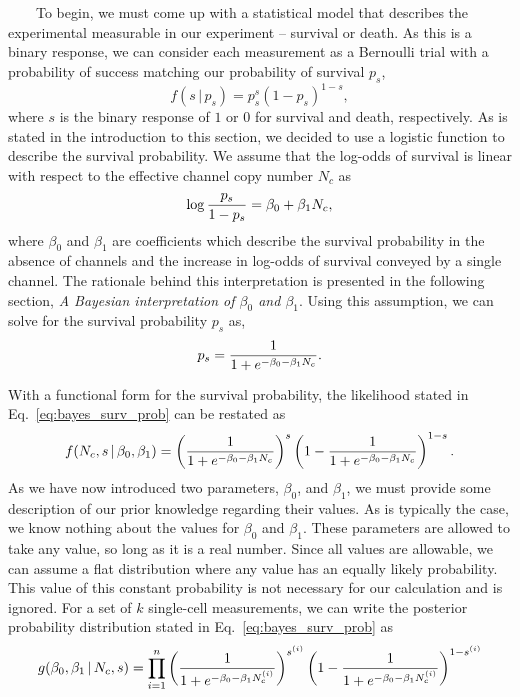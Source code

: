 ~~~~To
begin,
we
must
come
up
with a
statistical
model
that
describes
the
experimental
measurable
in our
experiment
--
survival
or
death.
As
this
is a
binary
response,
we can
consider
each
measurement
as a
Bernoulli
trial
with a
probability
of
success
matching
our
probability
of
survival
\(p_s\),
\begin{equation}
f(s\, \vert\, p_s) = p_s^s(1 - p_s)^{1-s},
\label{eq:bernoulli}\end{equation}
where
\(s\)
is the
binary
response
of
\(1\)
or
\(0\)
for
survival
and
death,
respectively.
As is
stated
in the
introduction
to
this
section,
we
decided
to use
a
logistic
function
to
describe
the
survival
probability.
We
assume
that
the
log-odds
of
survival
is
linear
with
respect
to the
effective
channel
copy
number
\(N_c\)
as
\begin{equation}
\log{p_s \over 1 - p_s} = \beta_0 + \beta_1 N_c,
\label{eq:logit}\end{equation}
where
\(\beta_0\)
and
\(\beta_1\)
are
coefficients
which
describe
the
survival
probability
in the
absence
of
channels
and
the
increase
in
log-odds
of
survival
conveyed
by a
single
channel.
The
rationale
behind
this
interpretation
is
presented
in the
following
section,
\emph{A
Bayesian
interpretation
of
\(\beta_0\)
and
\(\beta_1\)}.
Using
this
assumption,
we can
solve
for
the
survival
probability
\(p_s\)
as,
\begin{equation}
p_s = {1 \over 1 + e^{-\beta_0 -\beta_1 N_c}}.
\label{eq:logistic_prob}\end{equation}

With a
functional
form
for
the
survival
probability,
the
likelihood
stated
in
Eq.~\ref{eq:bayes_surv_prob}
can be
restated
as
\begin{equation}
f(N_c, s\,\vert\,\beta_0,\beta_1) = \left({1 \over 1 + e^{-\beta_0 - \beta_1 N_c}}\right)^s\left(1 - {1 \over 1 + e^{-\beta_0 - \beta_1 N_c}}\right)^{1 - s}.
\label{eq:bernoulli_likelihood}\end{equation}
As we
have
now
introduced
two
parameters,
\(\beta_0\),
and
\(\beta_1\),
we
must
provide
some
description
of our
prior
knowledge
regarding
their
values.
As is
typically
the
case,
we
know
nothing
about
the
values
for
\(\beta_0\)
and
\(\beta_1\).
These
parameters
are
allowed
to
take
any
value,
so
long
as it
is a
real
number.
Since
all
values
are
allowable,
we can
assume
a flat
distribution
where
any
value
has an
equally
likely
probability.
This
value
of
this
constant
probability
is not
necessary
for
our
calculation
and is
ignored.
For a
set of
\(k\)
single-cell
measurements,
we can
write
the
posterior
probability
distribution
stated
in
Eq.~\ref{eq:bayes_surv_prob}
as
\begin{equation}
g(\beta_0, \beta_1\,\vert\, N_c, s) = \prod\limits_{i=1}^n\left({1 \over 1 + e^{-\beta_0 - \beta_1 N_c^{(i)}}}\right)^{s^{(i)}}\left(1 - {1 \over 1 + e^{-\beta_0 - \beta_1 N_c^{(i)}}}\right)^{1 - s^{(i)}}
\label{eq:known_nc_post}\end{equation}

